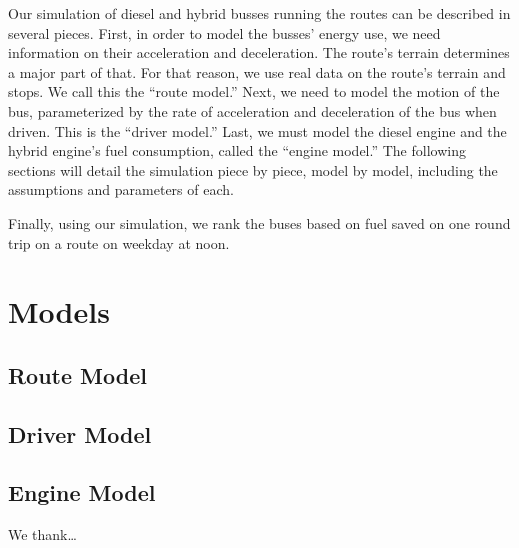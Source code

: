 \documentclass[twocolumn,showpacs,%
  nofootinbib,aps,superscriptaddress,%
  eqsecnum,prd,notitlepage,showkeys,10pt]{revtex4-1}
\begin{document}
Our simulation of diesel and hybrid busses running the routes can be described in several pieces. First, in order to model the busses’ energy use, we need information on their acceleration and deceleration. The route’s terrain determines a major part of that. For that reason, we use real data on the route’s terrain and stops. We call this the “route model.” Next, we need to model the motion of the bus, parameterized by the rate of acceleration and deceleration of the bus when driven. This is the “driver model.” Last, we must model the diesel engine and the hybrid engine’s fuel consumption, called the “engine model.” The following sections will detail the simulation piece by piece, model by model, including the assumptions and parameters of each.

Finally, using our simulation, we rank the buses based on fuel saved on one round trip on a route on weekday at noon. 


\section{Models}
\label{sec:models}

\subsection{Route Model}
\label{sec:route}


\subsection{Driver Model}
\label{sec:driver}



\subsection{Engine Model}
\label{sec:engine}



\begin{acknowledgments}

We thank\dots

\end{acknowledgments}
\end{document}
